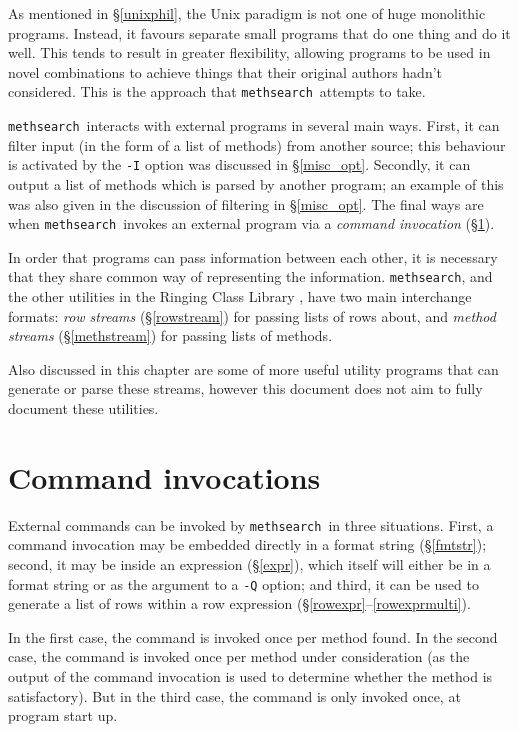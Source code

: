 \documentclass[a4paper,11pt,oneside]{book}
\makeatletter
\newcommand{\oi}[1]{\index{#1@{\hspace*{-\optwidth}\texttt{-}\texttt{#1}}}}
\def\methsearch{\texttt{meth\-search}}
\newcommand{\sref}[1]{\hyperref[#1]{\S\ref{#1}}}
\makeatother
\begin{document}
As mentioned in \sref{unixphil}, the Unix paradigm 
is not one of huge monolithic programs.  Instead, it favours separate
small programs that do one thing and do it well.  This tends to result in
greater flexibility, allowing programs to be used in novel combinations to
achieve things that their original authors hadn't considered.  This is
the approach that \methsearch\ attempts to take.

\methsearch\ interacts with external programs in several main ways.  First, it
can filter input (in the form of a list of methods) from another source;
this behaviour is activated by the \verb+-I+\oi{I} option was 
discussed in \sref{misc_opt}.  Secondly, it can output a list of methods
which is parsed by another program; an example of this was also given in
the discussion of filtering in \sref{misc_opt}.  The final ways are when 
\methsearch\ invokes an external program via a \textit{command invocation}
(\sref{cmdinv}).  

In order that programs can pass information between each other, 
it is necessary that they share common way of representing the information.  
\methsearch, and the other utilities in the Ringing Class Library%
, have two main interchange formats:
\textit{row streams} (\sref{rowstream}) 
for passing lists of rows about, and 
\textit{method streams} (\sref{methstream}) 
for passing lists of methods.%

Also discussed in this chapter are some of more useful utility programs
that can generate or parse these streams, however this document does not
aim to fully document these utilities.

\section{Command invocations}\label{cmdinv}

External commands can be invoked by \methsearch\ in three situations.
First, a command invocation may be embedded directly in a format string
(\sref{fmtstr}); second, it may be inside an expression (\sref{expr}),
which itself will either be in a format string or as the argument to a 
\verb+-Q+\oi{Q} option; and third, it can be used to 
generate a list of rows within a row expression 
(\sref{rowexpr}--\ref{rowexprmulti}).  

In the first case, the command is invoked once per method found.
In the second case, the command is invoked once per method under consideration
(as the output of the command invocation is used to determine whether the
method is satisfactory).  But in the third case, the command is only
invoked once, at program start up.
\end{document}
